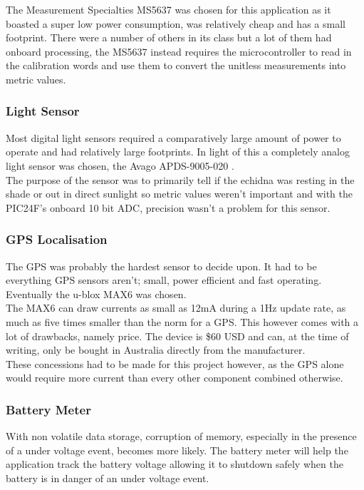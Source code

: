 \documentclass[12pt,openany,a4paper]{book}
\begin{document}
			The Measurement Specialties MS5637 \cite{MEASPRESSURE} was chosen for this application as it boasted a super low power consumption, was relatively cheap and has a small footprint. There were a number of others in its class but a lot of them had onboard processing, the MS5637 instead requires the microcontroller to read in the calibration words and use them to convert the unitless measurements into metric values. 
			\subsubsection{Light Sensor}
			Most digital light sensors required a comparatively large amount of power to operate and had relatively large footprints. In light of this a completely analog light sensor was chosen, the Avago APDS-9005-020 \cite{AVAGOLIGHT}. \\
			
			The purpose of the sensor was to primarily tell if the echidna was resting in the shade or out in direct sunlight so metric values weren't important and with the PIC24F's onboard 10 bit ADC, precision wasn't a problem for this sensor. 
			\subsubsection{GPS Localisation}
			The GPS was probably the hardest sensor to decide upon. It had to be everything GPS sensors aren't; small, power efficient and fast operating. Eventually the u-blox MAX6 \cite{ubloxGPS} was chosen. \\
			
			The MAX6 can draw currents as small as 12mA during a 1Hz update rate, as much as five times smaller than the norm for a GPS. This however comes with a lot of drawbacks, namely price. The device is \$60 USD and can, at the time of writing, only be bought in Australia directly from the manufacturer. \\
			
			These concessions had to be made for this project however, as the GPS alone would require more current than every other component combined otherwise.
			\subsubsection{Battery Meter}
			With non volatile data storage, corruption of memory, especially in the presence of a under voltage event, becomes more likely. The battery meter will help the application track the battery voltage allowing it to shutdown safely when the battery is in danger of an under voltage event. \\
			
\end{document}
